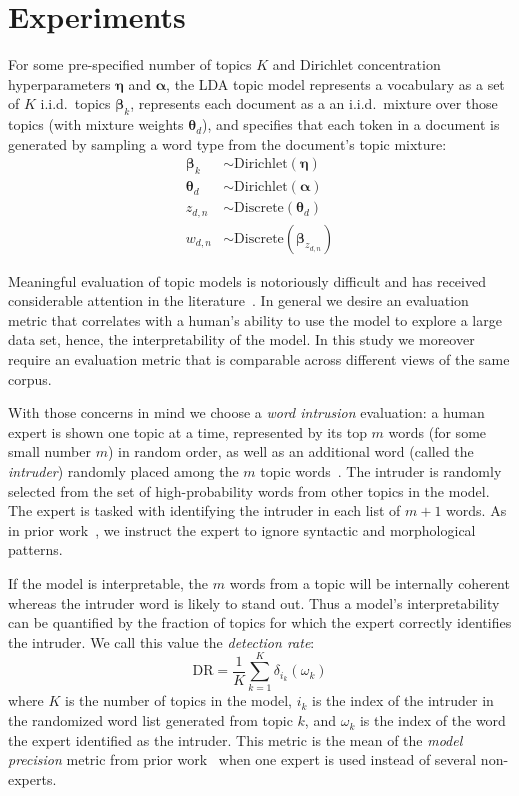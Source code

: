 \documentclass[11pt,letterpaper]{article}
\renewcommand{\vec}{\boldsymbol}   %
\newcommand{\valpha}{{\vec{\alpha}}}
\newcommand{\vtheta}{{\vec{\theta}}}
\newcommand{\veta}{{\vec{\eta}}}
\newcommand{\vbeta}{{\vec{\beta}}}
\newcommand{\dirac}[2]{\delta_{#1}\left(#2\right)}
\newcommand{\Discrete}{\ensuremath{\mathrm{Discrete}}}
\newcommand{\Dirichlet}{\ensuremath{\mathrm{Dirichlet}}}
\newcommand{\DR}{\ensuremath{\textrm{DR}}}
\begin{document}
{\section{Experiments}\label{sec:experiments}

For some pre-specified
number of topics $K$ and Dirichlet concentration hyperparameters
$\veta$ and $\valpha$, the LDA topic model represents a vocabulary as a
set of $K$ i.i.d.\ topics $\vbeta_k$, represents each document as a
an i.i.d.\ mixture over those topics (with mixture weights
$\vtheta_d$), and specifies that each token in a document is
generated by sampling a word type from the document's topic mixture:
\begin{align*}
    \vbeta_k  & \sim \Dirichlet\left(\veta\right) \\
    \vtheta_d & \sim \Dirichlet\left(\valpha\right) \\
    z_{d,n}              & \sim \Discrete\left(\vtheta_d\right) \\
    w_{d,n}              & \sim \Discrete\left(\vbeta_{z_{d,n}}\right)
\end{align*}

Meaningful evaluation of topic models is notoriously
difficult and has received considerable attention in the
literature~\cite{chang2009,wallach2009a,newman2010,mimno2011}.
In general we desire an evaluation metric that correlates with a
human's ability to use the model to explore a large data set,
hence, the interpretability of the model.  In this study we moreover
require an evaluation metric that is comparable across different views
of the same corpus.

With those concerns in mind we choose a \emph{word intrusion}
evaluation:
a human expert is shown one topic at a time, represented
by its top $m$ words (for some small number $m$) in random order, as
well as an additional word (called the \emph{intruder}) randomly placed
among the $m$ topic words~\cite{chang2009}.
The intruder is randomly selected from the set of high-probability
words from other topics in the model.
The expert is tasked with identifying the intruder in each list of
$m + 1$ words.
As in prior work~\cite{chang2009}, we instruct the expert to ignore
syntactic and morphological patterns.

If the model is interpretable, the $m$ words from a topic will be
internally coherent whereas the intruder word is likely to stand out.
Thus a model's interpretability can be quantified by the fraction
of topics for which the expert correctly identifies the intruder.  We
call this value the \emph{detection rate}:
\begin{equation*}
    \DR = \frac{1}{K} \sum_{k=1}^K \dirac{i_k}{\omega_k}
\end{equation*}
where $K$ is the number of topics in the model, $i_k$ is the index
of the intruder in the randomized word list generated from topic $k$,
and $\omega_k$ is the index of the word the expert identified as the
intruder.  This metric is the mean of the
\emph{model precision} metric from prior work~\cite{chang2009}
when one expert is used instead of several non-experts.

}
\end{document}
